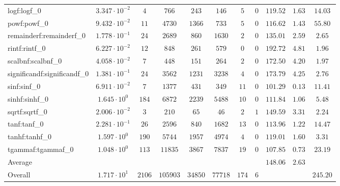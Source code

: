 \begin{tabular}{|l|c|c|c|c|c|c|c|c|c|c|}
logf:logf\_0                 & $ 3.347 \cdot 10^{-2} $ & $ 4      $ & $ 766    $ & $ 243   $ & $ 146   $ & $ 5   $ & $ 0 $ & $ 119.52      $ & $ 1.63    $ & $ 14.03   $ \\
powf:powf\_0                 & $ 9.432 \cdot 10^{-2} $ & $ 11     $ & $ 4730   $ & $ 1366  $ & $ 733   $ & $ 5   $ & $ 0 $ & $ 116.62      $ & $ 1.43    $ & $ 55.80   $ \\
remainderf:remainderf\_0     & $ 1.778 \cdot 10^{-1} $ & $ 24     $ & $ 2689   $ & $ 860   $ & $ 1630  $ & $ 2   $ & $ 0 $ & $ 135.01      $ & $ 2.59    $ & $ 2.65    $ \\
rintf:rintf\_0               & $ 6.227 \cdot 10^{-2} $ & $ 12     $ & $ 848    $ & $ 261   $ & $ 579   $ & $ 0   $ & $ 0 $ & $ 192.72      $ & $ 4.81    $ & $ 1.96    $ \\
scalbnf:scalbnf\_0           & $ 4.058 \cdot 10^{-2} $ & $ 7      $ & $ 448    $ & $ 151   $ & $ 264   $ & $ 2   $ & $ 0 $ & $ 172.50      $ & $ 4.20    $ & $ 1.97    $ \\
significandf:significandf\_0 & $ 1.381 \cdot 10^{-1} $ & $ 24     $ & $ 3562   $ & $ 1231  $ & $ 3238  $ & $ 4   $ & $ 0 $ & $ 173.79      $ & $ 4.25    $ & $ 2.76    $ \\
sinf:sinf\_0                 & $ 6.911 \cdot 10^{-2} $ & $ 7      $ & $ 1377   $ & $ 431   $ & $ 349   $ & $ 11  $ & $ 0 $ & $ 101.29      $ & $ 0.13    $ & $ 11.41   $ \\
sinhf:sinhf\_0               & $ 1.645 \cdot 10^{0}  $ & $ 184    $ & $ 6872   $ & $ 2239  $ & $ 5488  $ & $ 10  $ & $ 0 $ & $ 111.84      $ & $ 1.06    $ & $ 5.48    $ \\
sqrtf:sqrtf\_0               & $ 2.006 \cdot 10^{-2} $ & $ 3      $ & $ 210    $ & $ 65    $ & $ 46    $ & $ 2   $ & $ 1 $ & $ 149.59      $ & $ 3.31    $ & $ 2.24    $ \\
tanf:tanf\_0                 & $ 2.281 \cdot 10^{-1} $ & $ 26     $ & $ 2596   $ & $ 840   $ & $ 1682  $ & $ 13  $ & $ 0 $ & $ 113.96      $ & $ 1.22    $ & $ 14.47   $ \\
tanhf:tanhf\_0               & $ 1.597 \cdot 10^{0}  $ & $ 190    $ & $ 5744   $ & $ 1957  $ & $ 4974  $ & $ 4   $ & $ 0 $ & $ 119.01      $ & $ 1.60    $ & $ 3.31    $ \\
tgammaf:tgammaf\_0           & $ 1.048 \cdot 10^{0}  $ & $ 113    $ & $ 11835  $ & $ 3867  $ & $ 7837  $ & $ 19  $ & $ 0 $ & $ 107.85      $ & $ 0.73    $ & $ 23.19   $ \\
\hline
Average                      & $                     $ & $        $ & $        $ & $       $ & $       $ & $     $ & $   $ & $ 148.06      $ & $ 2.63    $ & $         $ \\
\hline
Overall                      & $ 1.717 \cdot 10^{1}  $ & $ 2106   $ & $ 105903 $ & $ 34850 $ & $ 77718 $ & $ 174 $ & $ 6 $ & $             $ & $         $ & $ 245.20  $ \\
\hline
\end{tabular}

